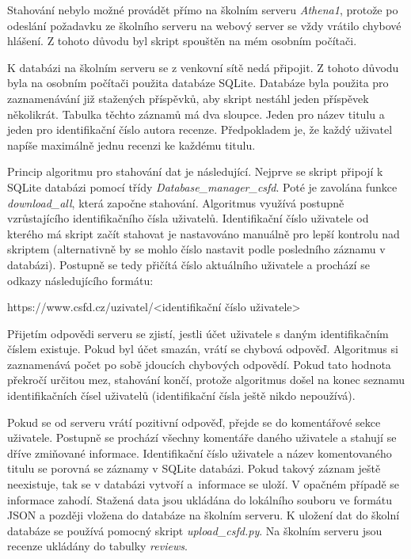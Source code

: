 Stahování nebylo možné provádět přímo na školním serveru \emph{Athena1}, protože po odeslání požadavku ze školního serveru na webový server se vždy vrátilo chybové hlášení. Z tohoto důvodu byl skript spouštěn na mém osobním počítači. 

K databázi na školním serveru se z venkovní sítě nedá připojit. Z tohoto důvodu byla na osobním počítači použita databáze SQLite. Databáze byla použita pro zaznamenávání již stažených příspěvků, aby skript nestáhl jeden příspěvek několikrát. Tabulka těchto záznamů má dva sloupce. Jeden pro název titulu a jeden pro identifikační číslo autora recenze. Předpokladem je, že každý uživatel napíše maximálně jednu recenzi ke každému titulu. 


Princip algoritmu pro stahování dat je následující. Nejprve se skript připojí k SQLite databázi pomocí třídy \emph{Database\_manager\_csfd}. Poté je zavolána funkce \emph{download\_all}, která započne stahování. Algoritmus využívá postupně vzrůstajícího identifikačního čísla uživatelů. Identifikační číslo uživatele od kterého má skript začít stahovat je nastavováno manuálně pro lepší kontrolu nad skriptem (alternativně by se mohlo číslo nastavit podle posledního záznamu v databázi). 
Postupně se tedy přičítá číslo aktuálního uživatele a prochází se odkazy následujícího formátu:
\begin{center}
    https://www.csfd.cz/uzivatel/<identifikační číslo uživatele>
\end{center}

Přijetím odpovědi serveru se zjistí, jestli účet uživatele s daným identifikačním číslem existuje. Pokud byl účet smazán, vrátí se chybová odpověď. Algoritmus si zaznamenává počet po sobě jdoucích chybových odpovědí. Pokud tato hodnota překročí určitou mez, stahování končí, protože algoritmus došel na konec seznamu identifikačních čísel uživatelů (identifikační čísla ještě nikdo nepoužívá). 

Pokud se od serveru vrátí pozitivní odpověď, přejde se do komentářové sekce uživatele. Postupně se prochází všechny komentáře daného uživatele a stahují se dříve zmiňované informace. Identifikační číslo uživatele a název komentovaného titulu se porovná se záznamy v SQLite databázi. Pokud takový záznam ještě neexistuje, tak se v databázi vytvoří a~informace se uloží. V opačném případě se informace zahodí. 
Stažená data jsou ukládána do lokálního souboru ve formátu JSON a později vložena do databáze na školním serveru. K uložení dat do školní databáze se používá pomocný skript \emph{upload\_csfd.py}. Na školním serveru jsou recenze ukládány do tabulky \emph{reviews}. 



